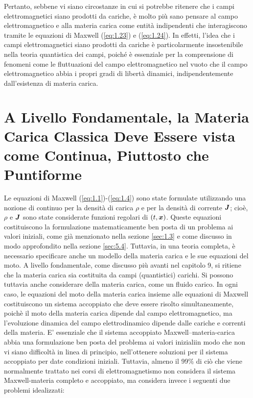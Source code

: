 Pertanto, sebbene vi siano circostanze in cui si potrebbe ritenere che i campi elettromagnetici siano prodotti da cariche, è molto più sano pensare al campo elettromagnetico e alla materia carica come entità indipendenti che interagiscono tramite le equazioni di Maxwell (\ref{eq:1.23}) e (\ref{eq:1.24}). In effetti, l'idea che i campi elettromagnetici siano prodotti da cariche è particolarmente insostenibile nella teoria quantistica dei campi, poiché è essenziale per la comprensione di fenomeni come le fluttuazioni del campo elettromagnetico nel vuoto che il campo elettromagnetico abbia i propri gradi di libertà dinamici, indipendentemente dall'esistenza di materia carica.

\section[Materia Carica come un Continuo]{A Livello Fondamentale, la Materia Carica Classica Deve Essere vista come Continua, Piuttosto che Puntiforme}\label{sec:1.4}

Le equazioni di Maxwell (\ref{eq:1.1})-(\ref{eq:1.4}) sono state formulate utilizzando una nozione di continuo per la densità di carica $\rho$ e per la densità di corrente $\vb*{J}$; cioè, $\rho$ e  $\vb*{J}$ sono state considerate funzioni regolari di $(t, \vb*{x})$. Queste equazioni costituiscono la formulazione matematicamente ben posta di un problema ai valori iniziali, come già menzionato nella sezione \ref{sec:1.3} e come discusso in modo approfondito nella sezione \ref{sec:5.4}. Tuttavia, in una teoria completa, è necessario specificare anche un modello della materia carica e le sue equazioni del moto. A livello fondamentale, come discusso più avanti nel capitolo 9, si ritiene che la materia carica sia costituita da campi (quantistici) carichi.  Si possono tuttavia anche considerare  della materia carica, come un fluido carico. In ogni caso, le equazioni del moto della materia carica insieme alle equazioni di Maxwell costituiscono un sistema accoppiato che deve essere risolto simultaneamente, poichè il moto della materia carica dipende dal campo elettromagnetico, ma l'evoluzione dinamica del campo elettrodinamico dipende dalle cariche e correnti della materia. E' essenziale che il sistema accoppiato Maxwell--materia-carica abbia una formulazione ben posta del problema ai valori inizialiin modo che non vi siano difficoltà in linea di principio, nell'ottenere soluzioni per il sistema accoppiato per date condizioni iniziali. Tuttavia, almeno il 99\% di ciò che viene normalmente trattato nei corsi di elettromagnetismo non considera il sistema Maxwell-materia completo e accoppiato, ma considera invece i seguenti due problemi idealizzati:

